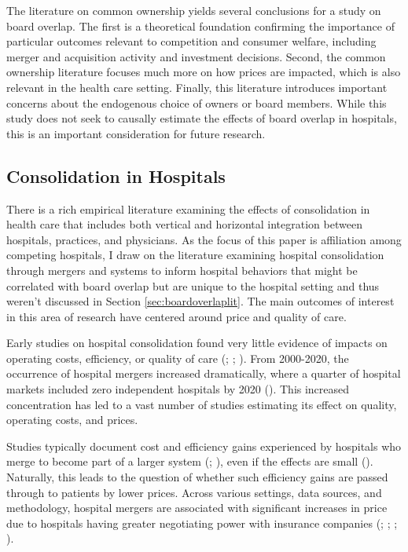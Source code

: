 \documentclass[12pt]{article}
\begin{document}
    The literature on common ownership yields several conclusions for a study on board overlap. The first is a theoretical foundation confirming the importance of particular outcomes relevant to competition and consumer welfare, including merger and acquisition activity and investment decisions. Second, the common ownership literature focuses much more on how prices are impacted, which is also relevant in the health care setting. Finally, this literature introduces important concerns about the endogenous choice of owners or board members. While this study does not seek to causally estimate the effects of board overlap in hospitals, this is an important consideration for future research. 
    

    \subsection{Consolidation in Hospitals}

    There is a rich empirical literature examining the effects of consolidation in health care that includes both vertical and horizontal integration between hospitals, practices, and physicians. As the focus of this paper is affiliation among competing hospitals, I draw on the literature examining hospital consolidation through mergers and systems to inform hospital behaviors that might be correlated with board overlap but are unique to the hospital setting and thus weren't discussed in Section \ref{sec:boardoverlaplit}. The main outcomes of interest in this area of research have centered around price and quality of care. 

    Early studies on hospital consolidation found very little evidence of impacts on operating costs, efficiency, or quality of care (\cite{alexander1996short}; \cite{ho2000hospital}; \cite{dranove2003hospital}). From 2000-2020, the occurrence of hospital mergers increased dramatically, where a quarter of hospital markets included zero independent hospitals by 2020 (\cite{ElevanceHealth2023}). This increased concentration has led to a vast number of studies estimating its effect on quality, operating costs, and prices. 

    Studies typically document cost and efficiency gains experienced by hospitals who merge to become part of a larger system (\cite{schmitt2017hospital}; \cite{andreyeva2024corporatization}), even if the effects are small (\cite{craig2021mergers}). Naturally, this leads to the question of whether such efficiency gains are passed through to patients by lower prices. Across various settings, data sources, and methodology, hospital mergers are associated with significant increases in price due to hospitals having greater negotiating power with insurance companies (\cite{gaynor2012impact}; \cite{boozary2019association}; \cite{cooper2019price}; \cite{andreyeva2024corporatization}). 
    
\end{document}
